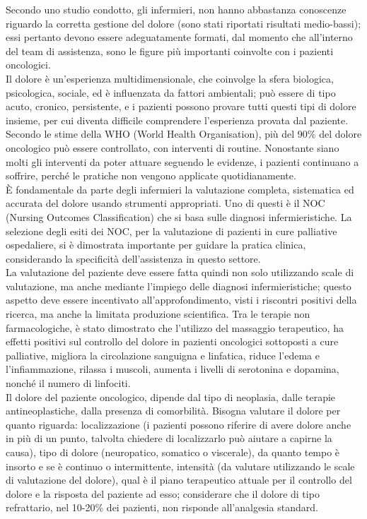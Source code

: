 Secondo uno studio condotto, gli infermieri, non hanno abbastanza conoscenze riguardo la corretta gestione del dolore
(sono stati riportati risultati medio-bassi); essi pertanto devono essere adeguatamente formati, 
dal momento che all’interno del team di assistenza, sono le figure più importanti coinvolte con i pazienti 
oncologici\cite{PAIN}.\\
Il dolore è un’esperienza multidimensionale, che coinvolge la sfera biologica, psicologica, sociale, ed è 
influenzata da fattori ambientali; può essere di tipo acuto, cronico, persistente, e i pazienti possono 
provare tutti questi tipi di dolore insieme, per cui diventa difficile comprendere l’esperienza provata dal 
paziente.\\ Secondo le stime  della WHO (World Health Organisation), più del 90\% del dolore oncologico può essere 
controllato, con interventi di routine. Nonostante siano molti gli interventi da poter attuare seguendo le evidenze, 
i pazienti continuano a soffrire, perché le pratiche non vengono applicate quotidianamente\cite{PAINONS}.\\
È fondamentale da parte degli infermieri la valutazione completa, sistematica ed accurata del dolore usando 
strumenti appropriati. Uno di questi è il NOC (Nursing Outcomes Classification) che si basa sulle diagnosi infermieristiche. 
La selezione degli esiti dei NOC, per la valutazione di pazienti in cure palliative ospedaliere, si è dimostrata 
importante per guidare la pratica clinica, considerando la specificità dell’assistenza in questo settore\cite{painNOC}.\\
La valutazione del paziente deve essere fatta quindi non solo utilizzando scale di valutazione, ma anche 
mediante l’impiego delle diagnosi infermieristiche; questo aspetto deve essere 
incentivato all’approfondimento, visti i riscontri positivi della ricerca, ma anche la limitata 
produzione scientifica.
Tra le terapie non farmacologiche, è stato dimostrato che l’utilizzo del massaggio terapeutico, ha effetti positivi sul 
controllo del dolore in pazienti oncologici sottoposti a cure palliative, migliora la circolazione sanguigna e linfatica, 
riduce l’edema e l’infiammazione, rilassa i muscoli, aumenta i livelli di 
serotonina e dopamina, nonché il numero di linfociti\cite{tpnonfarmacologiche}.\\

Il dolore del paziente oncologico, dipende dal tipo di neoplasia, dalle terapie antineoplastiche, 
dalla presenza di comorbilità. Bisogna valutare il dolore per quanto riguarda: 
localizzazione (i pazienti possono riferire di avere dolore anche in più di un punto, talvolta chiedere di 
localizzarlo può aiutare a capirne la causa), tipo di dolore (neuropatico, somatico o viscerale), 
da quanto tempo è insorto e se è continuo o intermittente, intensità (da valutare utilizzando le scale 
di valutazione del dolore), qual è il piano terapeutico attuale per il controllo del dolore e la risposta 
del paziente ad esso; considerare che il dolore di tipo refrattario, nel 10-20\% dei pazienti, 
non risponde all’analgesia standard\cite{CANCERPAINONS}.\\

